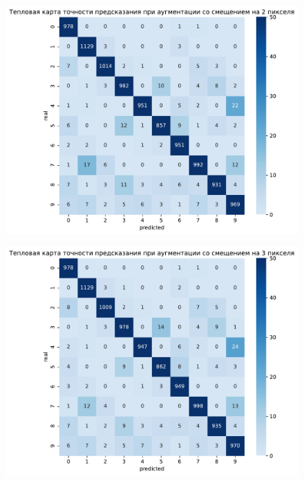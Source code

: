 \documentclass{article}
\begin{document}
\begin{figure}[H]
{        \label{app:shift1}
	}
	\subfigure
	{
		\begin{minipage}{8cm}
			\centering
			\includegraphics[scale=0.35]{TASK1 warm map shift2piks.pdf}
		\end{minipage}
		\label{app:shift2}
	}
	\subfigure
	{
		\begin{minipage}{8cm}
			\centering
			\includegraphics[scale=0.35]{TASK1 warm map shift3piks.pdf}
		\end{minipage}
		\label{app:shift3}
	}
\end{figure}
\end{document}
